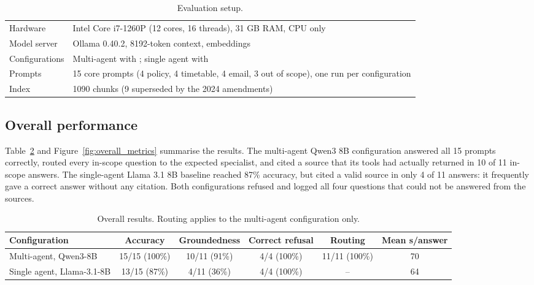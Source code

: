 \documentclass[11pt,a4paper]{article}
\newcommand{\code}[1]{\texttt{\detokenize{#1}}}
\begin{document}
\begin{table}[H]
\centering
\small
\begin{tabular}{ll}
\toprule
Hardware & Intel Core i7-1260P (12 cores, 16 threads), 31 GB RAM, CPU only\\
Model server & Ollama 0.40.2, 8192-token context, \code{nomic-embed-text} embeddings\\
Configurations & Multi-agent with \code{qwen3:8b}; single agent with \code{llama3.1:8b}\\
Prompts & 15 core prompts (4 policy, 4 timetable, 4 email, 3 out of scope), one run per configuration\\
Index & 1090 chunks (9 superseded by the 2024 amendments)\\
\bottomrule
\end{tabular}
\caption{Evaluation setup.}
\label{tab:setup}
\end{table}

\subsection{Overall performance}

Table~\ref{tab:overall} and Figure~\ref{fig:overall_metrics} summarise the results. The multi-agent Qwen3 8B configuration answered all 15 prompts correctly, routed every in-scope question to the expected specialist, and cited a source that its tools had actually returned in 10 of 11 in-scope answers. The single-agent Llama 3.1 8B baseline reached 87\% accuracy, but cited a valid source in only 4 of 11 answers: it frequently gave a correct answer without any citation. Both configurations refused and logged all four questions that could not be answered from the sources.

\begin{table}[H]
\centering
\small
\begin{tabular}{lccccc}
\toprule
Configuration & Accuracy & Groundedness & Correct refusal & Routing & Mean s/answer\\
\midrule
Multi-agent, Qwen3-8B & 15/15 (100\%) & 10/11 (91\%) & 4/4 (100\%) & 11/11 (100\%) & 70\\
Single agent, Llama-3.1-8B & 13/15 (87\%) & 4/11 (36\%) & 4/4 (100\%) & -- & 64\\
\bottomrule
\end{tabular}
\caption{Overall results. Routing applies to the multi-agent configuration only.}
\label{tab:overall}
\end{table}
\end{document}
